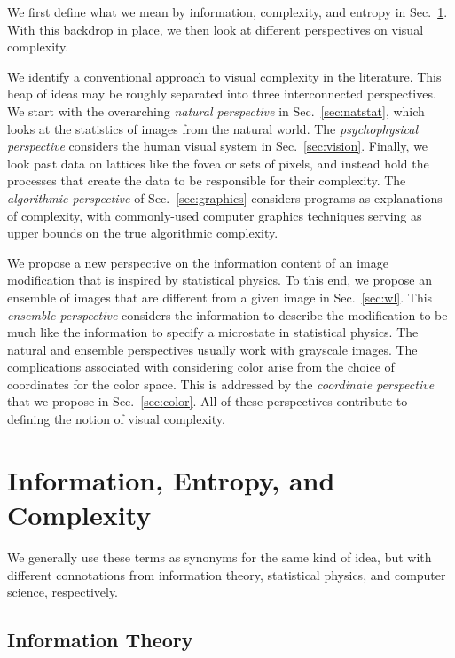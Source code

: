 \documentclass[aps,reprint,floatfix]{revtex4-2}
\theoremstyle{plain}
\theoremstyle{definition}
\begin{document}
We first define what we mean by information, complexity, and entropy in
Sec.~\ref{sec:bg}. With this backdrop in place, we then look at different
perspectives on visual complexity.

We identify a conventional approach to visual complexity in the literature. This
heap of ideas may be roughly separated into three interconnected perspectives.
We start with the overarching \emph{natural perspective} in
Sec.~\ref{sec:natstat}, which looks at the statistics of images from the natural
world. The \emph{psychophysical perspective} considers the human visual system
in Sec.~\ref{sec:vision}. Finally, we look past data on lattices like the fovea
or sets of pixels, and instead hold the processes that create the data to be
responsible for their complexity. The \emph{algorithmic perspective} of
Sec.~\ref{sec:graphics} considers programs as explanations of complexity, with
commonly-used computer graphics techniques serving as upper bounds on the true
algorithmic complexity.

We propose a new perspective on the information content of an image modification
that is inspired by statistical physics. To this end, we propose an ensemble of
images that are different from a given image in Sec.~\ref{sec:wl}. This
\emph{ensemble perspective} considers the information to describe the
modification to be much like the information to specify a microstate in
statistical physics. The natural and ensemble perspectives usually work with
grayscale images. The complications associated with considering color arise from
the choice of coordinates for the color space. This is addressed by the
\emph{coordinate perspective} that we propose in Sec.~\ref{sec:color}. All of
these perspectives contribute to defining the notion of visual complexity.

\section{Information, Entropy, and Complexity}\label{sec:bg}

We generally use these terms as synonyms for the same kind of idea, but with
different connotations from information theory, statistical physics, and
computer science, respectively.

\subsection{Information Theory}\label{sec:information-theory}
\end{document}
